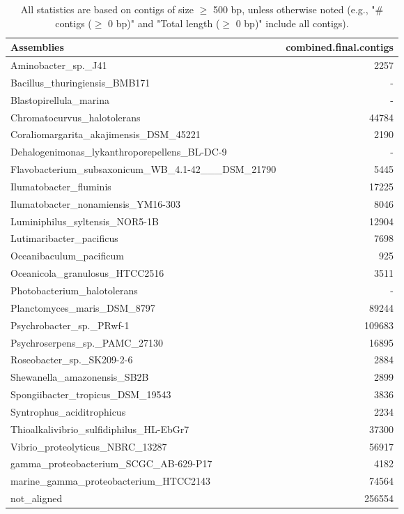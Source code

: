 \documentclass[12pt,a4paper]{article}
\begin{document}
\begin{table}[ht]
\begin{center}
\caption{All statistics are based on contigs of size $\geq$ 500 bp, unless otherwise noted (e.g., "\# contigs ($\geq$ 0 bp)" and "Total length ($\geq$ 0 bp)" include all contigs).}
\begin{tabular}{|l*{1}{|r}|}
\hline
Assemblies & combined.final.contigs \\ \hline
Aminobacter\_sp.\_J41 & 2257 \\ \hline
Bacillus\_thuringiensis\_BMB171 & - \\ \hline
Blastopirellula\_marina & - \\ \hline
Chromatocurvus\_halotolerans & 44784 \\ \hline
Coraliomargarita\_akajimensis\_DSM\_45221 & 2190 \\ \hline
Dehalogenimonas\_lykanthroporepellens\_BL-DC-9 & - \\ \hline
Flavobacterium\_subsaxonicum\_WB\_4.1-42\_\_\_DSM\_21790 & 5445 \\ \hline
Ilumatobacter\_fluminis & 17225 \\ \hline
Ilumatobacter\_nonamiensis\_YM16-303 & 8046 \\ \hline
Luminiphilus\_syltensis\_NOR5-1B & 12904 \\ \hline
Lutimaribacter\_pacificus & 7698 \\ \hline
Oceanibaculum\_pacificum & 925 \\ \hline
Oceanicola\_granulosus\_HTCC2516 & 3511 \\ \hline
Photobacterium\_halotolerans & - \\ \hline
Planctomyces\_maris\_DSM\_8797 & 89244 \\ \hline
Psychrobacter\_sp.\_PRwf-1 & 109683 \\ \hline
Psychroserpens\_sp.\_PAMC\_27130 & 16895 \\ \hline
Roseobacter\_sp.\_SK209-2-6 & 2884 \\ \hline
Shewanella\_amazonensis\_SB2B & 2899 \\ \hline
Spongiibacter\_tropicus\_DSM\_19543 & 3836 \\ \hline
Syntrophus\_aciditrophicus & 2234 \\ \hline
Thioalkalivibrio\_sulfidiphilus\_HL-EbGr7 & 37300 \\ \hline
Vibrio\_proteolyticus\_NBRC\_13287 & 56917 \\ \hline
gamma\_proteobacterium\_SCGC\_AB-629-P17 & 4182 \\ \hline
marine\_gamma\_proteobacterium\_HTCC2143 & 74564 \\ \hline
not\_aligned & 256554 \\ \hline
\end{tabular}
\end{center}
\end{table}
\end{document}
